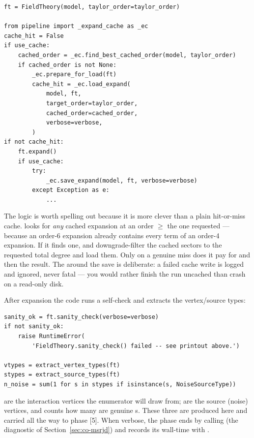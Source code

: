 \begin{lstlisting}
ft = FieldTheory(model, taylor_order=taylor_order)

from pipeline import _expand_cache as _ec
cache_hit = False
if use_cache:
    cached_order = _ec.find_best_cached_order(model, taylor_order)
    if cached_order is not None:
        _ec.prepare_for_load(ft)
        cache_hit = _ec.load_expand(
            model, ft,
            target_order=taylor_order,
            cached_order=cached_order,
            verbose=verbose,
        )
if not cache_hit:
    ft.expand()
    if use_cache:
        try:
            _ec.save_expand(model, ft, verbose=verbose)
        except Exception as e:
            ...
\end{lstlisting}

The logic is worth spelling out because it is more clever than a plain
hit-or-miss cache.  looks for \emph{any} cached
expansion at an order \emph{$\ge$} the one requested --- because an order-6
expansion already contains every term of an order-4 expansion. If it finds one,
 and  downgrade-filter the cached
sectors to the requested total degree and load them. Only on a genuine miss does
it pay for  and then  the result. The
 around the save is deliberate: a failed cache write is logged
and ignored, never fatal --- you would rather finish the run uncached than crash
on a read-only disk.

After expansion the code runs a self-check and extracts the vertex/source types:

\begin{lstlisting}
sanity_ok = ft.sanity_check(verbose=verbose)
if not sanity_ok:
    raise RuntimeError(
        'FieldTheory.sanity_check() failed -- see printout above.')

vtypes = extract_vertex_types(ft)
stypes = extract_source_types(ft)
n_noise = sum(1 for s in stypes if isinstance(s, NoiseSourceType))
\end{lstlisting}

 are the interaction vertices the enumerator will draw from;
 are the source (noise) vertices, and  counts how
many are genuine s. These three are produced here and
carried all the way to phase [5]. When verbose, the phase ends by calling
 (the diagnostic of
Section~\ref{sec:co-msrjd}) and records its wall-time with
.

